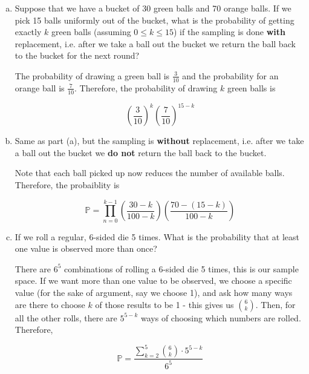 \documentclass[11pt]{article}
\begin{document}
\begin{enumerate}[(a)]
\item Suppose that we have a bucket of 30 green balls and 70 orange balls. If we pick 15 balls uniformly out of the bucket, what is the probability of getting exactly $k$ green balls (assuming $0 \leq k \leq 15$) if the sampling is done {\bf with} replacement, i.e. after we take a ball out the bucket we return the ball back to the bucket for the next round?

\begin{solution}
  The probability of drawing a green ball is $\frac{3}{10}$ and the probability for an orange ball is $\frac{7}{10}$. Therefore, the probability of drawing $k$ green balls is 

  \[ \left(\frac{3}{10}\right)^k \left(\frac{7}{10}\right)^{15 - k}\]
\end{solution}
    

\item Same as part (a), but the sampling is {\bf without} replacement, i.e. after we take a ball out the bucket we {\bf do not} return the ball back to the bucket.
\begin{solution}
  Note that each ball picked up now reduces the number of available balls. Therefore, the probaiblity is 

  \[ \mathbb P = \prod_{n = 0}^{k-1} \left(\frac{30-k}{100-k}\right) \left(\frac{70 - (15 - k)}{100 - k}\right)\]
\end{solution}
    

\item If we roll a regular, 6-sided die 5 times. What is the probability that at least one value is observed more than once?

\begin{solution}
  There are $6^5$ combinations of rolling a 6-sided die 5 times, this is our sample space. If we want more than one value to be observed, we choose a specific value (for the sake of argument, say we choose 1), and ask how many ways are there to choose $k$ of those results to be 1 - this gives us ${6 \choose k}$. Then, for all the other rolls, there are $5^{5-k}$ ways of choosing which numbers are rolled. Therefore, 

  \[ \mathbb P = \frac{\sum_{k = 2}^5 {6 \choose k} \cdot 5^{5-k}}{6^5}\]
\end{solution}
    

\end{enumerate}
\end{document}
